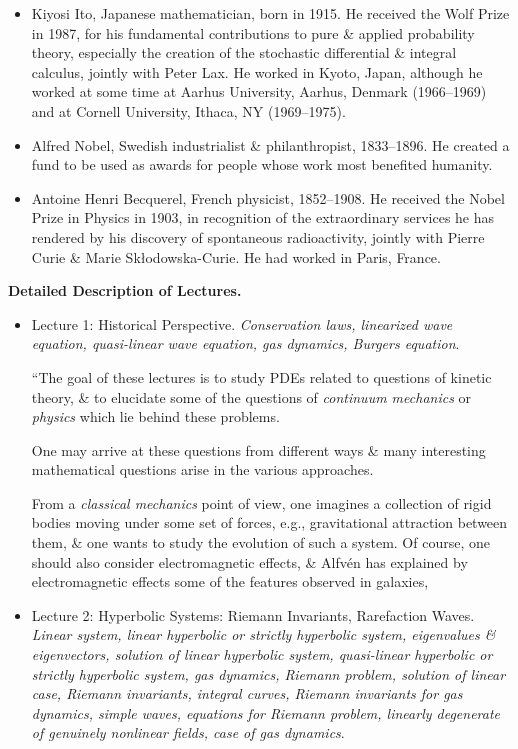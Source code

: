 \documentclass{article}
\begin{document}
\begin{enumerate}
\begin{itemize}
		\item {\sc Kiyosi Ito}, Japanese mathematician, born in 1915. He received the Wolf Prize in 1987, for his fundamental contributions to pure \& applied probability theory, especially the creation of the stochastic differential \& integral calculus, jointly with {\sc Peter Lax}. He worked in Kyoto, Japan, although he worked at some time at Aarhus University, Aarhus, Denmark (1966--1969) and at Cornell University, Ithaca, NY (1969--1975).
		\item {\sc Alfred Nobel}, Swedish industrialist \& philanthropist,  1833--1896. He created a fund to be used as awards for people whose work most benefited humanity.
		\item {\sc Antoine Henri Becquerel}, French physicist, 1852--1908. He received the Nobel Prize in Physics in 1903, in recognition of the extraordinary services he has rendered by his discovery of spontaneous radioactivity, jointly with {\sc Pierre Curie \& Marie Sk\l odowska-Curie}. He had worked in Paris, France.
	\end{itemize}
	{\bf Detailed Description of Lectures.}
	\begin{itemize}
		\item {\sf Lecture 1: Historical Perspective.} {\it Conservation laws, linearized wave equation, quasi-linear wave equation, gas dynamics, Burgers equation}.
		
		``The goal of these lectures is to study PDEs related to questions of kinetic theory, \& to elucidate some of the questions of {\it continuum mechanics} or {\it physics} which lie behind these problems.
		
		One may arrive at these questions from different ways \& many interesting mathematical questions arise in the various approaches.
		
		From a {\it classical mechanics} point of view, one imagines a collection of rigid bodies moving under some set of forces, e.g., gravitational attraction between them, \& one wants to study the evolution of such a system. Of course, one should also consider electromagnetic effects, \& {\sc Alfv\'en} has explained by electromagnetic effects some of the features observed in galaxies,
		
		\item {\sf Lecture 2: Hyperbolic Systems: Riemann Invariants, Rarefaction Waves.} {\it Linear system, linear hyperbolic or strictly hyperbolic system, eigenvalues \& eigenvectors, solution of linear hyperbolic system, quasi-linear hyperbolic or strictly hyperbolic system, gas dynamics, Riemann problem, solution of linear case, Riemann invariants, integral curves, Riemann invariants for gas dynamics, simple waves, equations for Riemann problem, linearly degenerate of genuinely nonlinear fields, case of gas dynamics}.
		

\end{itemize}
\end{enumerate}
\end{document}
